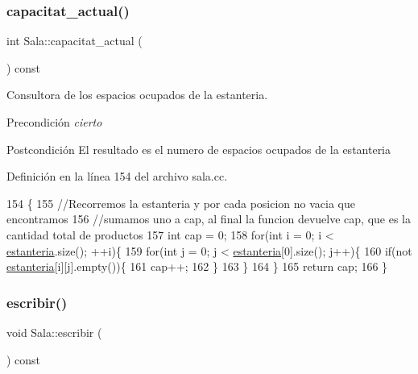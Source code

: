 \subsubsection{\texorpdfstring{capacitat\+\_\+actual()}{capacitat\_actual()}}
{\footnotesize\ttfamily int Sala\+::capacitat\+\_\+actual (\begin{DoxyParamCaption}{ }\end{DoxyParamCaption}) const}



Consultora de los espacios ocupados de la estanteria. 

\begin{DoxyPrecond}{Precondición}
{\itshape cierto} 
\end{DoxyPrecond}
\begin{DoxyPostcond}{Postcondición}
El resultado es el numero de espacios ocupados de la estanteria 
\end{DoxyPostcond}


Definición en la línea 154 del archivo sala.\+cc.


\begin{DoxyCode}
154                                 \{
155     \textcolor{comment}{//Recorremos la estanteria y por cada posicion no vacia que encontramos}
156     \textcolor{comment}{//sumamos uno a cap, al final la funcion devuelve cap, que es la cantidad total de productos}
157     \textcolor{keywordtype}{int} cap = 0;
158     \textcolor{keywordflow}{for}(\textcolor{keywordtype}{int} i = 0; i < \mbox{\hyperlink{class_sala_a8f5264818c98db9c0d075c51a7672d95}{estanteria}}.size(); ++i)\{
159         \textcolor{keywordflow}{for}(\textcolor{keywordtype}{int} j = 0; j < \mbox{\hyperlink{class_sala_a8f5264818c98db9c0d075c51a7672d95}{estanteria}}[0].size(); j++)\{
160             \textcolor{keywordflow}{if}(not \mbox{\hyperlink{class_sala_a8f5264818c98db9c0d075c51a7672d95}{estanteria}}[i][j].empty())\{
161                 cap++;
162             \}
163         \}
164     \}
165     \textcolor{keywordflow}{return} cap;
166 \}
\end{DoxyCode}
\mbox{\label{class_sala_a972a0cf004635c588343ddad949282e0}} 
\subsubsection{\texorpdfstring{escribir()}{escribir()}}
{\footnotesize\ttfamily void Sala\+::escribir (\begin{DoxyParamCaption}{ }\end{DoxyParamCaption}) const}



